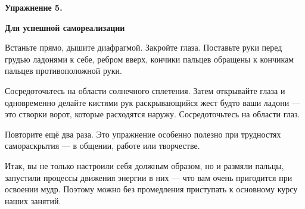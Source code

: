 \bigskip
\centerline{\bf Упражнение 5.}
\centerline{\bf Для успешной самореализации}
\medskip
Встаньте прямо, дышите диафрагмой. Закройте глаза. Поставьте руки перед грудью ладонями к себе, ребром вверх, кончики пальцев обращены к кончикам пальцев противоположной руки.

Сосредоточьтесь на области солнечного сплетения. Затем открывайте глаза и одновременно делайте
кистями рук раскрывающийся жест будто ваши ладони --- это створки ворот, которые расходятся наружу. Сосредоточьтесь на области глаз.

Повторите ещё два раза. Это упражнение особенно
полезно при трудностях самораскрытия --- в общении, работе или творчестве.

Итак, вы не только настроили себя должным образом, но и размяли пальцы, запустили процессы
движения энергии в них --- что вам очень пригодится
при освоении мудр. Поэтому можно без промедления приступать к основному курсу наших занятий.
\bye
